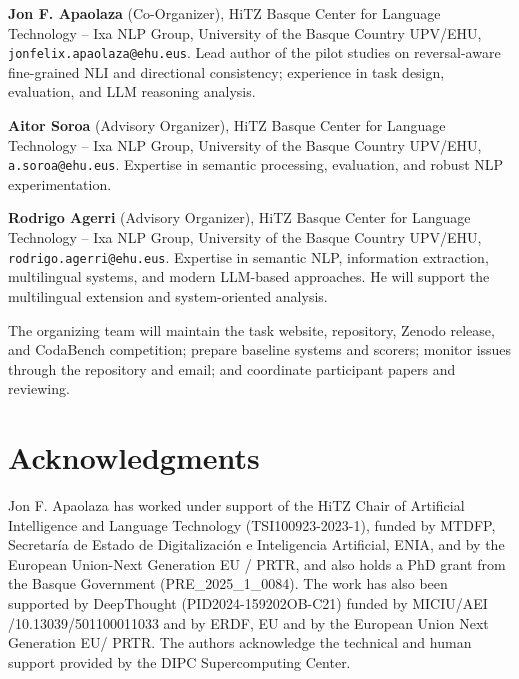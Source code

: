 \documentclass[11pt]{article}
\begin{document}
\medskip
\noindent\textbf{Jon F. Apaolaza} (Co-Organizer), HiTZ Basque Center for Language Technology -- Ixa NLP Group, University of the Basque Country UPV/EHU, \texttt{jonfelix.apaolaza@ehu.eus}.
Lead author of the pilot studies on reversal-aware fine-grained NLI and directional consistency; experience in task design, evaluation, and LLM reasoning analysis.

\medskip
\noindent\textbf{Aitor Soroa} (Advisory Organizer), HiTZ Basque Center for Language Technology -- Ixa NLP Group, University of the Basque Country UPV/EHU, \texttt{a.soroa@ehu.eus}.
Expertise in semantic processing, evaluation, and robust NLP experimentation.

\medskip
\noindent\textbf{Rodrigo Agerri} (Advisory Organizer), HiTZ Basque Center for Language Technology -- Ixa NLP Group, University of the Basque Country UPV/EHU, \texttt{rodrigo.agerri@ehu.eus}.
Expertise in semantic NLP, information extraction, multilingual systems, and modern LLM-based approaches.
He will support the multilingual extension and system-oriented analysis.

\medskip
The organizing team will maintain the task website, repository, Zenodo release, and CodaBench competition; prepare baseline systems and scorers; monitor issues through the repository and email; and coordinate participant papers and reviewing.

\section*{Acknowledgments}
Jon F. Apaolaza has worked under support of the HiTZ Chair of Artificial Intelligence and Language Technology (TSI100923-2023-1), funded by MTDFP, Secretaría de Estado de Digitalización e Inteligencia Artificial, ENIA, and by the European Union-Next Generation EU / PRTR, and also holds a PhD grant from the Basque Government (PRE\_2025\_1\_0084).
The work has also been supported by DeepThought (PID2024-159202OB-C21) funded by MICIU/AEI /10.13039/501100011033 and by ERDF, EU and by the European Union Next Generation EU/ PRTR.
The authors acknowledge the technical and human support provided by the DIPC Supercomputing Center.


\end{document}
